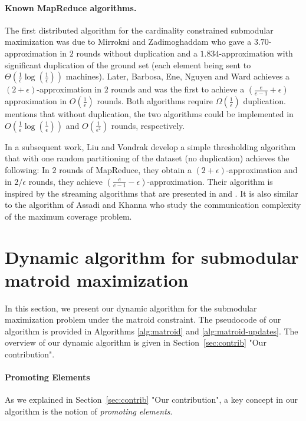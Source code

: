 \documentclass[11pt]{article}
\begin{document}
\paragraph{Known MapReduce algorithms.}
The first distributed algorithm for the cardinality constrained submodular maximization was due to Mirrokni and Zadimoghaddam \cite{DBLP:conf/stoc/MirrokniZ15} who gave a $3.70$-approximation in $2$
rounds without duplication and a $1.834$-approximation with significant duplication of the ground set (each element being sent
to $\Theta(\frac{1}{\epsilon}\log(\frac{1}{\epsilon}))$ machines).
Later, Barbosa, Ene, Nguyen and    Ward \cite{DBLP:conf/focs/BarbosaENW16}
achieves a $(2+\epsilon)$-approximation in $2$ rounds and
was the first to achieve a $(\frac{e}{e-1}+\epsilon)$ approximation  in $O(\frac{1}{\epsilon})$ rounds.
Both algorithms require $\Omega(\frac{1}{\epsilon})$ duplication.
\cite{DBLP:conf/focs/BarbosaENW16}
mentions that without duplication, the two algorithms could be implemented in
$O(\frac{1}{\epsilon}\log(\frac{1}{\epsilon}))$ and $O(\frac{1}{\epsilon^2})$ rounds, respectively.

In a subsequent work, Liu and Vondrak \cite{DBLP:conf/soda/LiuV19} develop a simple thresholding
algorithm that with one random partitioning of the dataset (no duplication) achieves the following:
In $2$ rounds of MapReduce, they obtain a $(2+\epsilon)$-approximation 
and in $2/\epsilon$ rounds, they achieve $(\frac{e}{e-1}-\epsilon)$-approximation.
Their algorithm is inspired by the streaming algorithms that are presented in \cite{DBLP:journals/topc/KumarMVV15} and 
\cite{DBLP:journals/mst/McGregorV19}. It is also similar to the algorithm of Assadi and Khanna \cite{DBLP:conf/soda/AssadiK18}
who study the communication complexity of the maximum coverage problem. 




\section{Dynamic algorithm for submodular matroid maximization}
\label{sec:algorithm:matroid}
In this section, we present our dynamic algorithm for the submodular maximization problem under the matroid constraint.
The pseudocode of our algorithm is provided in Algorithms \ref{alg:matroid} and \ref{alg:matroid-updates}. 
The overview of our dynamic algorithm is given in Section~\ref{sec:contrib} "Our contribution". 

\paragraph{Promoting Elements}
As we explained in Section~\ref{sec:contrib} "Our contribution", 
a key concept in our algorithm is the notion of \emph{promoting elements}.
\end{document}
